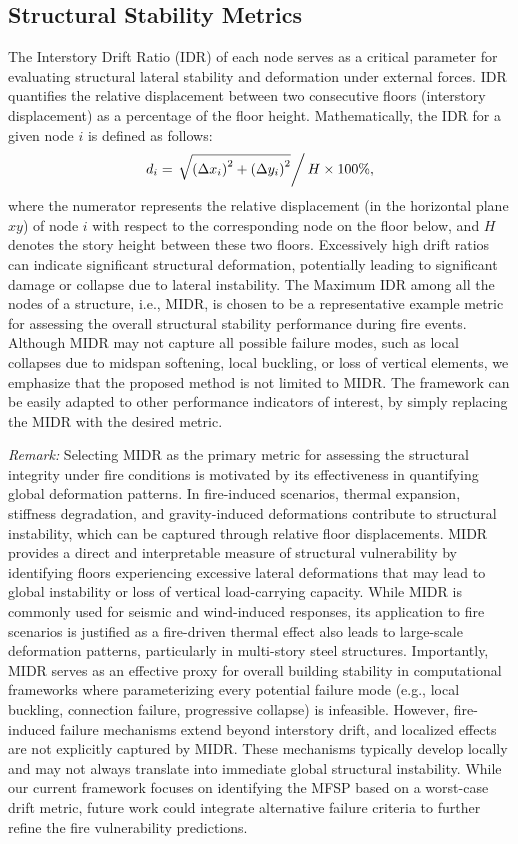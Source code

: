 {\blockRevise
\subsection{Structural Stability Metrics} 
The Interstory Drift Ratio (IDR) of each node serves as a critical parameter for evaluating structural lateral stability and deformation under external forces. IDR quantifies the relative displacement between two consecutive floors (interstory displacement) as a percentage of the floor height. Mathematically, the IDR for a given node $i$ is defined as follows:
\begin{equation}
    d_i = \left.\sqrt{\left(\Delta x_i\right)^2 + \left(\Delta y_i\right)^2}\right/ H \times 100 \%,
\end{equation}
where the numerator represents the relative displacement (in the horizontal plane $xy$) of node $i$ with respect to the corresponding node on the floor below, and $H$ denotes the story height between these two floors. Excessively high drift ratios can indicate significant structural deformation, potentially leading to significant damage or collapse due to lateral instability. The Maximum IDR among all the nodes of a structure, i.e., MIDR, is chosen to be a representative example metric for assessing the overall structural stability performance during fire events. Although MIDR may not capture all possible failure modes, such as local collapses due to midspan softening, local buckling, or loss of vertical elements, we emphasize that the proposed method is not limited to MIDR. The framework can be easily adapted to other performance indicators of interest, by simply replacing the MIDR with the desired metric.

\textit{Remark:} Selecting MIDR as the primary metric for assessing the structural integrity under fire conditions is motivated by its effectiveness in quantifying global deformation patterns. In fire-induced scenarios, thermal expansion, stiffness degradation, and gravity-induced deformations contribute to structural instability, which can be captured through relative floor displacements. MIDR provides a direct and interpretable measure of structural vulnerability by identifying floors experiencing excessive lateral deformations that may lead to global instability or loss of vertical load-carrying capacity. While MIDR is commonly used for seismic and wind-induced responses, its application to fire scenarios is justified as a fire-driven thermal effect also leads to large-scale deformation patterns, particularly in multi-story steel structures. Importantly, MIDR serves as an effective proxy for overall building stability in computational frameworks where parameterizing every potential failure mode (e.g., local buckling, connection failure, progressive collapse) is infeasible. However, fire-induced failure mechanisms extend beyond interstory drift, and localized effects are not explicitly captured by MIDR. These mechanisms typically develop locally and may not always translate into immediate global structural instability. While our current framework focuses on identifying the MFSP based on a worst-case drift metric, future work could integrate alternative failure criteria to further refine the fire vulnerability predictions.

}
